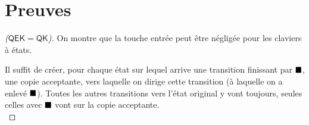 \documentclass[12pt, a4paper]{article}
\begin{document}
    
    \clearpage
    \appendix
    \section{Preuves}
    \begin{proof}[($\mathsf{QEK} = \mathsf{QK}$)]
        On montre que la touche entrée peut être négligée pour les claviers à états.

        Il suffit de créer, pour chaque état sur lequel arrive une transition finissant par $\mathord{\blacksquare}$, une copie acceptante, vers laquelle on dirige cette transition (à laquelle on a enlevé $\mathord{\blacksquare}$).
        Toutes les autres transitions vers l'état original y vont toujours, seules celles avec $\mathord{\blacksquare}$ vont sur la copie acceptante. \medskip \\
    \end{proof}
\end{document}
